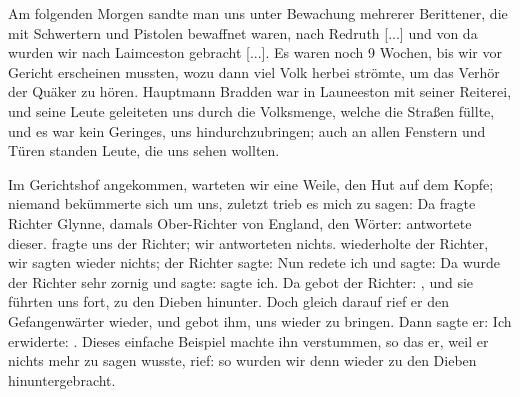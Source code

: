 Am folgenden Morgen sandte
man uns unter Bewachung mehrerer Berittener, die mit Schwertern
und Pistolen bewaffnet waren, nach Redruth [...] und von da
wurden wir nach Laimceston gebracht [...].
Es waren noch 9 Wochen, bis wir vor Gericht erscheinen
mussten, wozu dann viel Volk herbei strömte, um das Verhör der
Quäker zu hören. Hauptmann Bradden war in Launeeston mit
seiner Reiterei, und seine Leute geleiteten uns durch die 
Volksmenge, welche die Straßen füllte, und es war kein Geringes, uns
hindurchzubringen; auch an allen Fenstern und Türen standen
Leute, die uns sehen wollten. 

Im Gerichtshof angekommen,
warteten wir eine Weile, den Hut auf dem Kopfe; niemand 
bekümmerte sich um uns, zuletzt trieb es mich zu sagen: 
 Da fragte Richter Glynne, 
damals Ober-Richter
von England, den Wörter:   
antwortete dieser.  fragte
uns der Richter; wir antworteten nichts.  wiederholte der Richter, wir sagten wieder nichts; der
Richter sagte: 
Nun redete ich und sagte: 
Da wurde der Richter sehr zornig und sagte:  
sagte ich. Da gebot der Richter: , und sie führten uns fort, zu den Dieben hinunter.
Doch gleich darauf rief er den Gefangenwärter wieder, und
gebot ihm, uns wieder zu bringen. Dann sagte er:  Ich erwiderte:
. Dieses 
einfache Beispiel machte ihn verstummen,
so das er, weil er nichts mehr zu sagen wusste, rief: 
 so wurden wir denn 
wieder zu den Dieben hinuntergebracht. 


